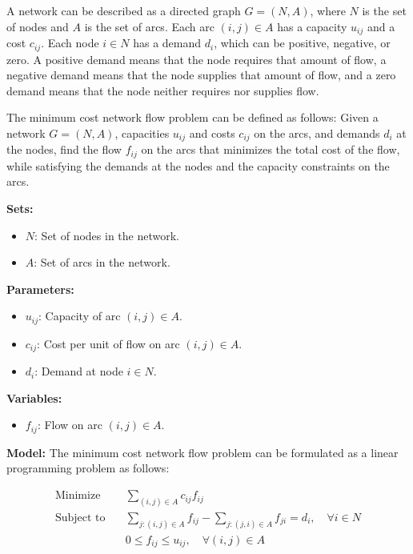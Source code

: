 {A network can be described as a directed graph \( G = (N, A) \), where \( N \) is the set of nodes and \( A \) is the set of arcs. Each arc \( (i, j) \in A \) has a capacity \( u_{ij} \) and a cost \( c_{ij} \). Each node \( i \in N \) has a demand \( d_i \), which can be positive, negative, or zero. A positive demand means that the node requires that amount of flow, a negative demand means that the node supplies that amount of flow, and a zero demand means that the node neither requires nor supplies flow.

The minimum cost network flow problem can be defined as follows: Given a network \( G = (N, A) \), capacities \( u_{ij} \) and costs \( c_{ij} \) on the arcs, and demands \( d_i \) at the nodes, find the flow \( f_{ij} \) on the arcs that minimizes the total cost of the flow, while satisfying the demands at the nodes and the capacity constraints on the arcs.

\noindent \textbf{Sets:}
\begin{itemize}
\item \( N \): Set of nodes in the network.
\item \( A \): Set of arcs in the network.
\end{itemize}

\noindent \textbf{Parameters:}
\begin{itemize}
\item \( u_{ij} \): Capacity of arc \( (i, j) \in A \).
\item \( c_{ij} \): Cost per unit of flow on arc \( (i, j) \in A \).
\item \( d_i \): Demand at node \( i \in N \).
\end{itemize}

\noindent \textbf{Variables:}
\begin{itemize}
\item \( f_{ij} \): Flow on arc \( (i, j) \in A \).
\end{itemize}

\noindent \textbf{Model:}
The minimum cost network flow problem can be formulated as a linear programming problem as follows:

\begin{align*}
\text{Minimize} \quad & \sum_{(i, j) \in A} c_{ij} f_{ij} \\
\text{Subject to} \quad & \sum_{j:(i, j) \in A} f_{ij} - \sum_{j:(j, i) \in A} f_{ji} = d_i, \quad \forall i \in N \\
& 0 \leq f_{ij} \leq u_{ij}, \quad \forall (i, j) \in A
\end{align*}

}
